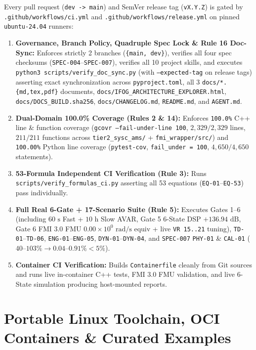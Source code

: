 \documentclass[11pt,a4paper]{article}
\begin{document}
Every pull request (\texttt{dev -> main}) and SemVer release tag (\texttt{vX.Y.Z}) is gated by \texttt{.github/workflows/ci.yml} and \texttt{.github/workflows/release.yml} on pinned \texttt{ubuntu-24.04} runners:
\begin{enumerate}
    \item \textbf{Governance, Branch Policy, Quadruple Spec Lock \& Rule 16 Doc-Sync:} Enforces strictly 2 branches (\texttt{\{main, dev\}}), verifies all four spec checksums (\texttt{SPEC-004}--\texttt{SPEC-007}), verifies all 10 project skills, and executes \texttt{python3 scripts/verify\_doc\_sync.py} (with \texttt{--expected-tag} on release tags) asserting exact synchronization across \texttt{pyproject.toml}, all 3 \texttt{docs/*.\{md,tex,pdf\}} documents, \texttt{docs/IFOG\_ARCHITECTURE\_EXPLORER.html}, \texttt{docs/DOCS\_BUILD.sha256}, \texttt{docs/CHANGELOG.md}, \texttt{README.md}, and \texttt{AGENT.md}.
    \item \textbf{Dual-Domain 100.0\% Coverage (Rules 2 \& 14):} Enforces \texttt{100.0\%} C++ line \& function coverage (\texttt{gcovr --fail-under-line 100}, $2{,}329/2{,}329$ lines, $211/211$ functions across \texttt{tier2\_sysc\_ams/} + \texttt{fmi\_wrapper/src/}) and \texttt{100.00\%} Python line coverage (\texttt{pytest-cov}, \texttt{fail\_under = 100}, $4{,}650/4{,}650$ statements).
    \item \textbf{53-Formula Independent CI Verification (Rule 3):} Runs \texttt{scripts/verify\_formulas\_ci.py} asserting all 53 equations (\texttt{EQ-01}--\texttt{EQ-53}) pass individually.
    \item \textbf{Full Real 6-Gate + 17-Scenario Suite (Rule 5):} Executes Gates 1--6 (including $60\text{ s}$ Fast + $10\text{ h}$ Slow AVAR, Gate 5 6-State DSP $+136.94\text{ dB}$, Gate 6 FMI 3.0 FMU $0.00\times 10^0\text{ rad/s}$ equiv + live \texttt{VR 15..21} tuning), \texttt{TD-01}--\texttt{TD-06}, \texttt{ENG-01}--\texttt{ENG-05}, \texttt{DYN-01}--\texttt{DYN-04}, and \texttt{SPEC-007} \texttt{PHY-01} \& \texttt{CAL-01} ($40$--$103\% \to 0.04$--$0.91\% < 5\%$).
    \item \textbf{Container CI Verification:} Builds \texttt{Containerfile} cleanly from Git sources and runs live in-container C++ tests, FMI 3.0 FMU validation, and live 6-State simulation producing host-mounted reports.
\end{enumerate}

\section{Portable Linux Toolchain, OCI Containers \& Curated Examples}
\end{document}
